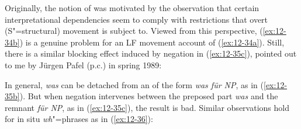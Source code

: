 \documentclass[output=paper]{langsci/langscibook}
\begin{document}
Originally, the notion of  was motivated by the observation that
certain interpretational dependencies seem to comply with restrictions that
overt (S"=structural) movement is subject to. Viewed from this perspective,
(\ref{ex:12-34b}) is a genuine problem for an LF movement account of (\ref{ex:12-34a}). Still, there
is a similar blocking effect induced by negation in (\ref{ex:12-35c}), pointed out to me
by Jürgen Pafel (p.c.) in spring 1989:
\begin{exe}
\ex
\label{ex:12-35}
\begin{xlist}
\end{xlist}
\end{exe}
In general, \textit{was} can be detached from an  of the form \textit{was für NP}, as in (\ref{ex:12-35b}). But when negation intervenes between the preposed part \textit{was} and the remnant \textit{für NP}, as in (\ref{ex:12-35c}), the result is bad. Similar observations hold for in situ \emph{wh}"=phrases as in (\ref{ex:12-36}):
\begin{exe}
\ex
\label{ex:12-36}
\begin{xlist}
\end{xlist}
\end{exe}
\end{document}
